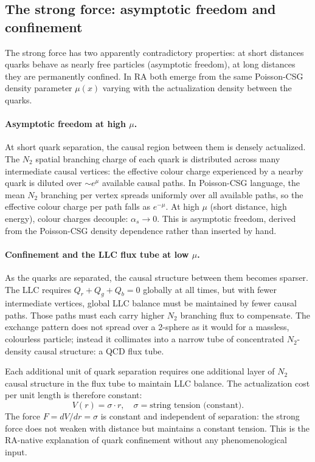 \documentclass[11pt]{article}
\begin{document}
\subsection{The strong force: asymptotic freedom and confinement}

The strong force has two apparently contradictory properties: at short distances quarks behave as nearly free particles (asymptotic freedom), at long distances they are permanently confined. In RA both emerge from the same Poisson-CSG density parameter $\mu(x)$ varying with the actualization density between the quarks.

\paragraph{Asymptotic freedom at high $\mu$.} At short quark separation, the causal region between them is densely actualized. The $N_2$ spatial branching charge of each quark is distributed across many intermediate causal vertices: the effective colour charge experienced by a nearby quark is diluted over $\sim e^\mu$ available causal paths. In Poisson-CSG language, the mean $N_2$ branching per vertex spreads uniformly over all available paths, so the effective colour charge per path falls as $e^{-\mu}$. At high $\mu$ (short distance, high energy), colour charges decouple: $\alpha_s\to 0$. This is asymptotic freedom, derived from the Poisson-CSG density dependence rather than inserted by hand.

\paragraph{Confinement and the LLC flux tube at low $\mu$.} As the quarks are separated, the causal structure between them becomes sparser. The LLC requires $Q_r+Q_g+Q_b=0$ globally at all times, but with fewer intermediate vertices, global LLC balance must be maintained by fewer causal paths. Those paths must each carry higher $N_2$ branching flux to compensate. The exchange pattern does not spread over a 2-sphere as it would for a massless, colourless particle; instead it collimates into a narrow tube of concentrated $N_2$-density causal structure: a QCD flux tube.

Each additional unit of quark separation requires one additional layer of $N_2$ causal structure in the flux tube to maintain LLC balance. The actualization cost per unit length is therefore constant:
\begin{equation}
V(r) = \sigma\cdot r,\quad \sigma=\text{string tension (constant)}.
\end{equation}
The force $F=dV/dr=\sigma$ is constant and independent of separation: the strong force does not weaken with distance but maintains a constant tension. This is the RA-native explanation of quark confinement without any phenomenological input.
\end{document}
